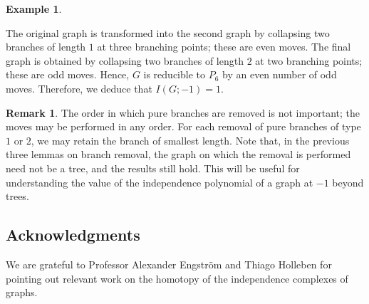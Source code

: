 \documentclass[12pt,amscd]{amsart}
\theoremstyle{definition}
\newtheorem{exm}[thm]{Example}
\newtheorem{rem}[thm]{Remark}
\numberwithin{equation}{section}
\begin{document}
\begin{exm}
\begin{center}

\end{center}
The original graph is transformed into the second graph by collapsing two branches of length \(1\) at three branching points; these are even moves. The final graph is obtained by collapsing two branches of length \(2\) at two branching points; these are odd moves. Hence, \( G \) is reducible to \( P_6 \) by an even number of odd moves. Therefore, we deduce that \( I(G; -1) = 1 \).
\end{exm}


\begin{rem}
The order in which pure branches are removed is not important; the moves may be performed in any order. For each removal of pure branches of type \(1\) or \(2\), we may retain the branch of smallest length. Note that, in the previous three lemmas on branch removal, the graph on which the removal is performed need not be a tree, and the results still hold. This will be useful for understanding the value of the independence polynomial of a graph at $-1$ beyond trees.
\end{rem}


\subsection*{Acknowledgments}
We are grateful to Professor Alexander Engstr\"om and Thiago Holleben for pointing out relevant work on the homotopy of the independence complexes of graphs.
\end{document}
